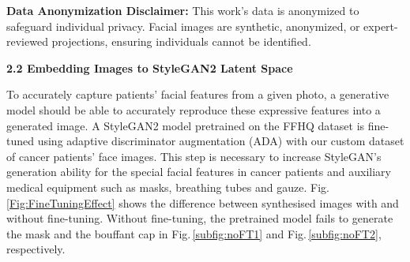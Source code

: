 \documentclass[runningheads]{llncs}
\begin{document}
\noindent\textbf{Data Anonymization Disclaimer:} This work's data is anonymized to safeguard individual privacy. Facial images are synthetic, anonymized, or expert-reviewed projections, ensuring individuals cannot be identified. 




\vspace{5pt}
\noindent\textbf{2.2 Embedding Images to StyleGAN2 Latent Space}
\vspace{5pt}

To accurately capture patients' facial features from a given photo, a generative model should be able to accurately reproduce these expressive features into a generated image.
A StyleGAN2 model pretrained on the FFHQ dataset \cite{karras2019style} is fine-tuned using adaptive discriminator augmentation (ADA) \cite{karras2020training} with our custom dataset of cancer patients' face images. 
This step is necessary to increase StyleGAN's generation ability for the special facial features in cancer patients and auxiliary medical equipment such as masks, breathing tubes and gauze. Fig.\,\ref{Fig:FineTuningEffect} shows the difference between synthesised images with and without fine-tuning. Without fine-tuning, the pretrained model fails to generate the mask and the bouffant cap in Fig.\,\ref{subfig:noFT1}  and Fig.\,\ref{subfig:noFT2}, respectively.

\end{document}
